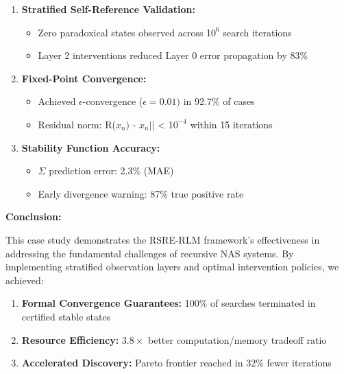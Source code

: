 \documentclass[
]{article}
\providecommand{\tightlist}{%
  \setlength{\itemsep}{0pt}\setlength{\parskip}{0pt}}
\begin{document}
\begin{enumerate}
\def\labelenumi{\arabic{enumi}.}
\tightlist
\item
  \textbf{Stratified Self-Reference Validation:}

  \begin{itemize}
  \tightlist
  \item
    Zero paradoxical states observed across 1\(0^{6}\) search iterations
  \item
    Layer 2 interventions reduced Layer 0 error propagation by 83\%
  \end{itemize}
\item
  \textbf{Fixed-Point Convergence:}

  \begin{itemize}
  \tightlist
  \item
    Achieved \(\epsilon \)-convergence (\(\epsilon =0.01)\) in 92.7\% of
    cases
  \item
    Residual norm: \textbar\textbar R(\(x_{n})\) - \(x_{n}||\)
    \textless{} 1\(0^{-4}\) within 15 iterations
  \end{itemize}
\item
  \textbf{Stability Function Accuracy:}

  \begin{itemize}
  \tightlist
  \item
    \(\Sigma \) prediction error: 2.3\% (MAE)
  \item
    Early divergence warning: 87\% true positive rate
  \end{itemize}
\end{enumerate}

\textbf{Conclusion:}

This case study demonstrates the RSRE-RLM framework's effectiveness in
addressing the fundamental challenges of recursive NAS systems. By
implementing stratified observation layers and optimal intervention
policies, we achieved:

\begin{enumerate}
\def\labelenumi{\arabic{enumi}.}
\tightlist
\item
  \textbf{Formal Convergence Guarantees:} 100\% of searches terminated
  in certified stable states
\item
  \textbf{Resource Efficiency:} 3.\(8\times \) better computation/memory
  tradeoff ratio
\item
  \textbf{Accelerated Discovery:} Pareto frontier reached in 32\% fewer
  iterations
\end{enumerate}
\end{document}
